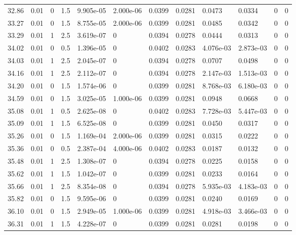\documentclass[preview]{standalone}
\begin{document}
{{{{{\begin{tabular}{L{1.2cm}C{1.2cm} C{0.3cm}C{0.5cm} C{1.4cm}C{1.4cm} C{1.4cm}C{1.4cm} C{1.6cm}C{1.6cm} C{1.6cm}C{1.6cm}}
  32.86  &  0.01  & 0     & 1.5 &  9.905e-05  & 2.000e-06  &  0.0399&   0.0281& 0.0473 & 0.0334   &  0 & 0  \\ 
  33.27  &  0.01  & 0     & 1.5 &  8.755e-05  & 2.000e-06  &  0.0399&   0.0281& 0.0485 & 0.0342   &  0 & 0  \\ 
  33.29  &  0.01  & 1     & 2.5 &  3.619e-07  & 0  &  0.0394&   0.0278& 0.0444 & 0.0313   &  0 & 0  \\ 
  34.02  &  0.01  & 0     & 0.5 &  1.396e-05  & 0  &  0.0402&   0.0283& 4.076e-03 & 2.873e-03   &  0 & 0  \\ 
  34.03  &  0.01  & 1     & 2.5 &  2.045e-07  & 0  &  0.0394&   0.0278& 0.0707 & 0.0498   &  0 & 0  \\ 
  34.16  &  0.01  & 1     & 2.5 &  2.112e-07  & 0  &  0.0394&   0.0278& 2.147e-03 & 1.513e-03   &  0 & 0  \\ 
  34.20  &  0.01  & 0     & 1.5 &  1.574e-06  & 0  &  0.0399&   0.0281& 8.768e-03 & 6.180e-03   &  0 & 0  \\ 
  34.59  &  0.01  & 0     & 1.5 &  3.025e-05  & 1.000e-06  &  0.0399&   0.0281& 0.0948 & 0.0668   &  0 & 0  \\ 
  35.08  &  0.01  & 1     & 0.5 &  2.625e-08  & 0  &  0.0402&   0.0283& 7.728e-03 & 5.447e-03   &  0 & 0  \\ 
  35.09  &  0.01  & 1     & 1.5 &  6.525e-08  & 0  &  0.0399&   0.0281& 0.0450 & 0.0317   &  0 & 0  \\ 
  35.26  &  0.01  & 0     & 1.5 &  1.169e-04  & 2.000e-06  &  0.0399&   0.0281& 0.0315 & 0.0222   &  0 & 0  \\ 
  35.36  &  0.01  & 0     & 0.5 &  2.387e-04  & 4.000e-06  &  0.0402&   0.0283& 0.0187 & 0.0132   &  0 & 0  \\ 
  35.48  &  0.01  & 1     & 2.5 &  1.308e-07  & 0  &  0.0394&   0.0278& 0.0225 & 0.0158   &  0 & 0  \\ 
  35.62  &  0.01  & 1     & 1.5 &  1.042e-07  & 0  &  0.0399&   0.0281& 0.0233 & 0.0164   &  0 & 0  \\ 
  35.66  &  0.01  & 1     & 2.5 &  8.354e-08  & 0  &  0.0394&   0.0278& 5.935e-03 & 4.183e-03   &  0 & 0  \\ 
  35.82  &  0.01  & 0     & 1.5 &  9.595e-06  & 0  &  0.0399&   0.0281& 0.0240 & 0.0169   &  0 & 0  \\ 
  36.10  &  0.01  & 0     & 1.5 &  2.949e-05  & 1.000e-06  &  0.0399&   0.0281& 4.918e-03 & 3.466e-03   &  0 & 0  \\ 
  36.31  &  0.01  & 1     & 1.5 &  4.228e-07  & 0  &  0.0399&   0.0281& 0.0281 & 0.0198   &  0 & 0  \\ 

\end{tabular}}}}}}
\end{document}
